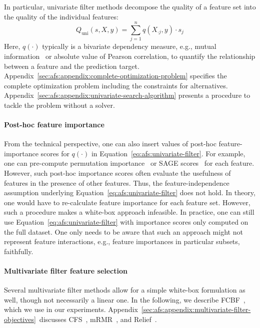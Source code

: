\documentclass{article}
\theoremstyle{definition}
\begin{document}
In particular, univariate filter methods decompose the quality of a feature set into the quality of the individual features:
%
\begin{equation}
	Q_{\text{uni}}(s,X,y) = \sum_{j=1}^{n} q(X_{\cdot{}j},y) \cdot s_j
	\label{eq:afs:univariate-filter}
\end{equation}
%
Here, $q(\cdot)$ typically is a bivariate dependency measure, e.g., mutual information~\cite{kraskov2004estimating} or absolute value of Pearson correlation, to quantify the relationship between a feature and the prediction target.
Appendix~\ref{sec:afs:appendix:complete-optimization-problem} specifies the complete optimization problem including the constraints for alternatives.
Appendix~\ref{sec:afs:appendix:univariate-search-algorithm} presents a procedure to tackle the problem without a solver.

\paragraph{Post-hoc feature importance}

From the technical perspective, one can also insert values of post-hoc feature-importance scores for $q(\cdot)$ in Equation~\ref{eq:afs:univariate-filter}.
For example, one can pre-compute permutation importance~\cite{breiman2001random} or SAGE scores~\cite{covert2020understanding} for each feature.
However, such post-hoc importance scores often evaluate the usefulness of features in the presence of other features.
Thus, the feature-independence assumption underlying Equation~\ref{eq:afs:univariate-filter} does not hold.
In theory, one would have to re-calculate feature importance for each feature set.
However, such a procedure makes a white-box approach infeasible.
In practice, one can still use Equation~\ref{eq:afs:univariate-filter} with importance scores only computed on the full dataset.
One only needs to be aware that such an approach might not represent feature interactions, e.g., feature importances in particular subsets, faithfully.

\paragraph{Multivariate filter feature selection}

Several multivariate filter methods allow for a simple white-box formulation as well, though not necessarily a linear one.
In the following, we describe FCBF~\cite{yu2003feature}, which we use in our experiments.
Appendix~\ref{sec:afs:appendix:multivariate-filter-objectives}~discusses CFS~\cite{hall1999correlation, hall2000correlation}, mRMR~\cite{peng2005feature}, and Relief~\cite{kira1992feature, robnik1997adaptation}.
\end{document}
